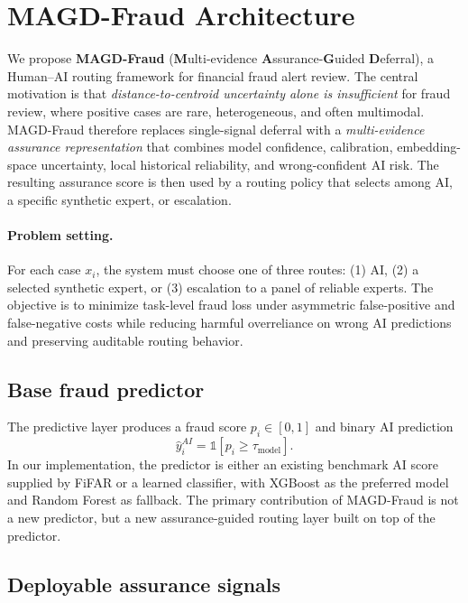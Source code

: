 \section{MAGD-Fraud Architecture}
\label{sec:magd_architecture}

We propose \textbf{MAGD-Fraud} (\textbf{M}ulti-evidence \textbf{A}ssurance-\textbf{G}uided \textbf{D}eferral), a Human--AI routing framework for financial fraud alert review. The central motivation is that \emph{distance-to-centroid uncertainty alone is insufficient} for fraud review, where positive cases are rare, heterogeneous, and often multimodal. MAGD-Fraud therefore replaces single-signal deferral with a \emph{multi-evidence assurance representation} that combines model confidence, calibration, embedding-space uncertainty, local historical reliability, and wrong-confident AI risk. The resulting assurance score is then used by a routing policy that selects among AI, a specific synthetic expert, or escalation.

\paragraph{Problem setting.}
For each case $x_i$, the system must choose one of three routes:
(1) AI, (2) a selected synthetic expert, or (3) escalation to a panel of reliable experts.
The objective is to minimize task-level fraud loss under asymmetric false-positive and false-negative costs while reducing harmful overreliance on wrong AI predictions and preserving auditable routing behavior.

\subsection{Base fraud predictor}

The predictive layer produces a fraud score $p_i \in [0,1]$ and binary AI prediction
\begin{equation}
\hat{y}^{AI}_i = \mathbb{1}[p_i \ge \tau_{\text{model}}].
\end{equation}
In our implementation, the predictor is either an existing benchmark AI score supplied by FiFAR or a learned classifier, with XGBoost as the preferred model and Random Forest as fallback. The primary contribution of MAGD-Fraud is not a new predictor, but a new assurance-guided routing layer built on top of the predictor.

\subsection{Deployable assurance signals}

